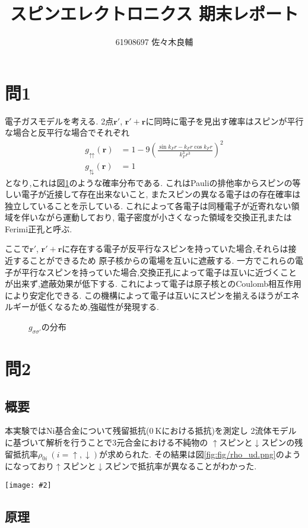 \documentclass[uplatex,a4j,11pt,dvipdfmx]{jsarticle}
\makeatletter
\def\fgcaption{\def\@captype{figure}\caption}
\newcommand{\mfig}[3][width=15cm]{
\begin{center}
\texttt{[image: \#2]}
\fgcaption{#3 \label{fig:#2}}
\end{center}
}
\newcommand{\gnu}[2]{
\begin{figure}[hptb]
\begin{center}

\caption{#1}
\label{fig:#2}
\end{center}
\end{figure}
}
\makeatother
\begin{document}
\title{スピンエレクトロニクス 期末レポート}
\author{61908697 佐々木良輔}
\date{}
\maketitle
\section*{問1}
電子ガスモデルを考える.
2点$\bm r'$, $\bm r'+\bm r$に同時に電子を見出す確率はスピンが平行な場合と反平行な場合でそれぞれ
\begin{align}
  g_{\upuparrows}({\bm r})&=1-9\left(\frac{\sin k_Fr-k_Fr\cos k_Fr}{k_F^3r^3}\right)^2\\
  g_{\updownarrows}({\bm r})&=1
\end{align}
となり,これは図\ref{fig:fig/guu.tex}のような確率分布である.\cite{spinOneD6:online}\cite{3rdpdf26:online}
これはPauliの排他率からスピンの等しい電子が近接して存在出来ないこと,
またスピンの異なる電子はの存在確率は独立していることを示している.
これによって各電子は同種電子が近寄れない領域を伴いながら運動しており,
電子密度が小さくなった領域を交換正孔またはFerimi正孔と呼ぶ.

ここで$\bm r'$, $\bm r'+\bm r$に存在する電子が反平行なスピンを持っていた場合,それらは接近することができるため
原子核からの電場を互いに遮蔽する.
一方でこれらの電子が平行なスピンを持っていた場合,交換正孔によって電子は互いに近づくことが出来ず,遮蔽効果が低下する.
これによって電子は原子核とのCoulomb相互作用により安定化できる.
この機構によって電子は互いにスピンを揃えるほうがエネルギーが低くなるため,強磁性が発現する.
\gnu{$g_{\sigma\sigma'}$の分布}{fig/guu.tex}
\clearpage
\section*{問2}
\subsection*{概要}
本実験ではNi基合金について残留抵抗($0\ \si{\kelvin}$における抵抗)を測定し
2流体モデルに基づいて解析を行うことで3元合金における不純物の
$\uparrow$スピンと$\downarrow$スピンの残留抵抗率$\rho_{0i}\ (i=\uparrow,\downarrow)$が求められた.
その結果は図\ref{fig:fig/rho_ud.png}のようになっており$\uparrow$スピンと$\downarrow$スピンで抵抗率が異なることがわかった.\cite{fert_electrical_1976}
\mfig[width=8cm]{fig/rho_ud.png}{3元合金における不純物の抵抗率(□:$\rho_{0\uparrow}$, ○:$\rho_{0\downarrow}$)\cite{fert_electrical_1976}}
\subsection*{原理}
\end{document}
